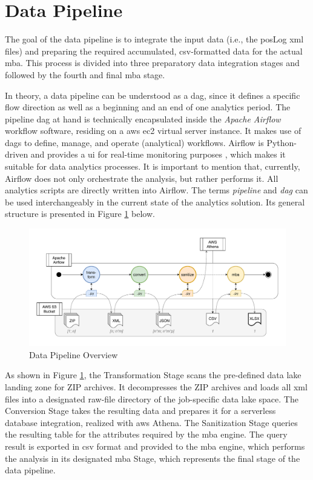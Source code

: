 \section{Data Pipeline} \label{sec:3-data-pipeline}
The goal of the data pipeline is to integrate the input data (i.e., the \ac{pos}Log \ac{xml} files) and preparing the required accumulated, \ac{csv}-formatted data for the actual \ac{mba}. This process is divided into three preparatory data integration stages and followed by the fourth and final \ac{mba} stage.

In theory, a data pipeline can be understood as a \ac{dag}, since it defines a specific flow direction as well as a beginning and an end of one analytics period. The pipeline \ac{dag} at hand is technically encapsulated inside the \textit{Apache Airflow} workflow software, residing on a \ac{aws} \ac{ec2} virtual server instance. It makes use of \acp{dag} to define, manage, and operate (analytical) workflows. Airflow is Python-driven and provides a \ac{ui} for real-time monitoring purposes \cite{airflow}, which makes it suitable for data analytics processes. It is important to mention that, currently, Airflow does not only orchestrate the analysis, but rather performs it. All analytics scripts are directly written into Airflow. The terms \textit{pipeline} and \textit{\ac{dag}} can be used interchangeably in the current state of the analytics solution. Its general structure is presented in Figure \ref{fig:3-data-pipeline} below.

\begin{figure}[h!]
	\includegraphics[width=\linewidth]{main-matter/img/3-3-data-pipeline.pdf}
	\caption{Data Pipeline Overview}
	\label{fig:3-data-pipeline}	
\end{figure}

As shown in Figure \ref{fig:3-data-pipeline}, the Transformation Stage scans the pre-defined data lake landing zone for ZIP archives. It decompresses the ZIP archives and loads all \ac{xml} files into a designated raw-file directory of the job-specific data lake space. The Conversion Stage takes the resulting data and prepares it for a serverless database integration, realized with \ac{aws} Athena. The Sanitization Stage queries the resulting table for the attributes required by the \ac{mba} engine. The query result is exported in \ac{csv} format and provided to the \ac{mba} engine, which performs the analysis in its designated \ac{mba} Stage, which represents the final stage of the data pipeline.

